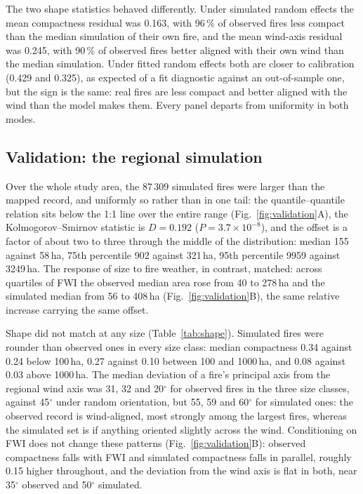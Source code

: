 \documentclass[ResearchPaper,linenum]{CSIRO_LaTeX_Template}
\begin{document}
The two shape statistics behaved differently.
Under simulated random effects the mean compactness residual was 0.163, with
96\,\% of observed fires less compact than the median simulation of their own fire, and
the mean wind-axis residual was 0.245, with 90\,\% of observed fires better aligned with
their own wind than the median simulation. Under fitted random effects both are closer
to calibration (0.429 and 0.325), as expected of a fit diagnostic against an
out-of-sample one, but the sign is the same: real fires are less compact and better
aligned with the wind than the model makes them. Every panel departs from uniformity
in both modes.

\subsection{Validation: the regional simulation}

Over the whole study area, the 87\,309 simulated fires were larger than the mapped
record, and uniformly so rather than in one tail: the quantile--quantile relation sits
below the 1:1 line over the entire range (Fig.~\ref{fig:validation}A), the
Kolmogorov--Smirnov statistic is $D = 0.192$ ($P = 3.7 \times 10^{-8}$), and the offset
is a factor of about two to three through the middle of the distribution: median 155
against 58\,ha, 75th percentile 902 against 321\,ha, 95th percentile 9959 against
3249\,ha. The response of size to fire weather, in contrast, matched: across quartiles
of FWI the observed median area rose from 40 to 278\,ha and the simulated median from
56 to 408\,ha (Fig.~\ref{fig:validation}B), the same relative increase carrying the
same offset.

Shape did not match at any size (Table~\ref{tab:shape}). Simulated fires were rounder
than observed ones in every size class: median compactness 0.34 against 0.24 below
100\,ha, 0.27 against 0.10 between 100 and 1000\,ha, and 0.08 against 0.03 above
1000\,ha. The median deviation of a fire's
principal axis from the regional wind axis was 31, 32 and 20$^\circ$ for observed fires
in the three size classes, against 45$^\circ$ under random orientation, but 55, 59 and
60$^\circ$ for simulated ones: the observed record is wind-aligned, most strongly among
the largest fires, whereas the simulated set is if anything oriented slightly across the
wind. Conditioning on FWI does not change these patterns (Fig.~\ref{fig:validation}B):
observed compactness falls with FWI and simulated compactness falls in parallel,
roughly 0.15 higher throughout, and the deviation from the wind axis is flat in both,
near 35$^\circ$ observed and 50$^\circ$ simulated.
\end{document}
